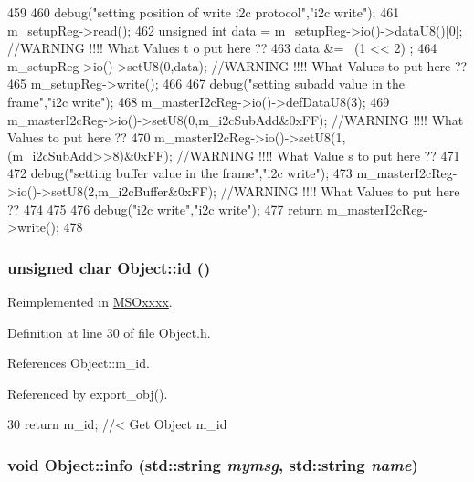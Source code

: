 \begin{DoxyCode}
459                           {
460   debug("setting position of write i2c protocol","i2c write");
461   m_setupReg->read();
462   unsigned int data = m_setupReg->io()->dataU8()[0]; //WARNING !!!! What Values t
      o put here ??
463   data &= ~(1 << 2)  ; 
464   m_setupReg->io()->setU8(0,data); //WARNING !!!! What Values to put here ??
465   m_setupReg->write();
466 
467   debug("setting subadd value in the frame","i2c write");
468   m_masterI2cReg->io()->defDataU8(3);
469   m_masterI2cReg->io()->setU8(0,m_i2cSubAdd&0xFF); //WARNING !!!! What Values to 
      put here ??
470   m_masterI2cReg->io()->setU8(1,(m_i2cSubAdd>>8)&0xFF); //WARNING !!!! What Value
      s to put here ??
471 
472   debug("setting buffer value in the frame","i2c write");
473   m_masterI2cReg->io()->setU8(2,m_i2cBuffer&0xFF); //WARNING !!!! What Values to 
      put here ??
474 
475 
476   debug("i2c write","i2c write");
477   return m_masterI2cReg->write();
478 }
\end{DoxyCode}
\hypertarget{classObject_af99145335cc61ff6e2798ea17db009d2}{
\subsubsection[{id}]{\setlength{\rightskip}{0pt plus 5cm}unsigned char Object::id ()}}
\label{classObject_af99145335cc61ff6e2798ea17db009d2}


Reimplemented in \hyperlink{classMSOxxxx_a0f14b23d31d8e7647184e99a89600cc3}{MSOxxxx}.

Definition at line 30 of file Object.h.

References Object::m\_\-id.

Referenced by export\_\-obj().


\begin{DoxyCode}
30 { return m_id;         } //< Get Object m_id 
\end{DoxyCode}
\hypertarget{classObject_a1ca123253dfd30fc28b156f521dcbdae}{
\subsubsection[{info}]{\setlength{\rightskip}{0pt plus 5cm}void Object::info (std::string {\em mymsg}, \/  std::string {\em name})}}
\label{classObject_a1ca123253dfd30fc28b156f521dcbdae}


